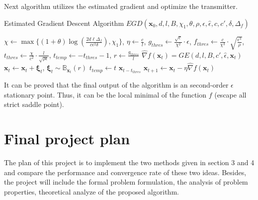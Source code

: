 \documentclass[12pt,a4paper]{article}
\begin{document}
	\par Next algorithm utilizes the estimated gradient and optimize the transmitter.
	\begin{algorithm}[h]
		\label{PGD-MF}
		\caption{Estimated Gradient Descent Algorithm $EGD(\bm{x}_0,d,l,B,\chi_1,\theta,\rho,\epsilon,\hat{\epsilon},c,c',\delta,\Delta_f)$}
		\begin{algorithmic}[1]
			\State $\chi \leftarrow \max\{(1+\theta)\log(\frac{2d\ell\Delta_f}{c\epsilon^2\delta}), \chi_1\}$, $\eta\leftarrow\frac{c}{l}$, $g_{thres}\leftarrow\frac{\sqrt{c}}{\chi^2}\cdot\epsilon$, $f_{thres}\leftarrow\frac{c}{\chi^3}\cdot\sqrt{\frac{\epsilon^3}{\rho}}$, $t_{thres}\leftarrow\frac{\chi}{c^2}\cdot\frac{l}{\sqrt{\rho\epsilon}}$, $t_{temp}\leftarrow-t_{thres}-1$, $r\leftarrow \frac{g_{thres}}{l}$
			\State $\hat{\nabla}f(\bm{x}_t)=GE(d,l,B,c',\hat{\epsilon},\bm{x}_t)$
			\State $\bm{x}_t\leftarrow\bm{x}_t+\bm{\xi}_t$, $\bm{\xi}_t\sim\mathbb{B}_{\bm{x}_t}(r)$
			\State $t_{temp}\leftarrow t$
			\EndIf
			\State \Return $\bm{x}_{t-t_{thres}}$
			\EndIf
			\State $\bm{x}_{t+1}\leftarrow\bm{x}_t-\eta\hat{\nabla}f(\bm{x}_t)$
			\EndFor
		\end{algorithmic}
	\end{algorithm}
	\par It can be proved that the final output of the algorithm is an second-order $\epsilon$ stationary point. Thus, it can be the local minimal of the function $f$ (escape all strict saddle point). 
	\section{Final project plan}
	\noindent
	\par The plan of this project is to implement the two methods given in section 3 and 4 and compare the performance and convergence rate of these two ideas. Besides, the project will include the formal problem formulation, the analysis of problem properties, theoretical analyze of the proposed algorithm.
	

\end{document}
